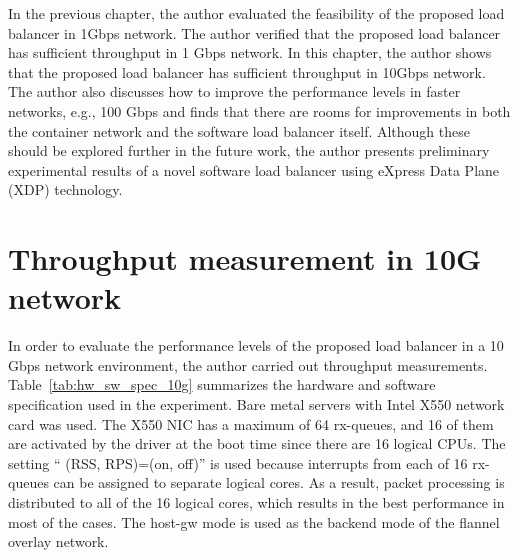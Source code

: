 In the previous chapter, the author evaluated the feasibility of the proposed load balancer in 1Gbps network.
The author verified that the proposed load balancer has sufficient throughput in 1 Gbps network.
In this chapter, the author shows that the proposed load balancer has sufficient throughput in 10Gbps network.
The author also discusses how to improve the performance levels in faster networks, e.g., 100 Gbps and finds that there are rooms for improvements in both the container network and the software load balancer itself.
Although these should be explored further in the future work, the author presents preliminary experimental results of a novel software load balancer using eXpress Data Plane (XDP) technology.



\section{Throughput measurement in 10G network}

In order to evaluate the performance levels of the proposed load balancer in a 10 Gbps network environment, the author carried out throughput measurements.
Table~\ref{tab:hw_sw_spec_10g} summarizes the hardware and software specification used in the experiment.
Bare metal servers with Intel X550 network card was used.
The X550 NIC has a maximum of 64 rx-queues, and 16 of them are activated by the driver at the boot time since there are 16 logical CPUs.
The setting \enquote{ (RSS, RPS)=(on, off)} is used because interrupts from each of 16 rx-queues can be assigned to separate logical cores.
As a result, packet processing is distributed to all of the 16 logical cores, which results in the best performance in most of the cases.
The host-gw mode is used as the backend mode of the flannel overlay network.

